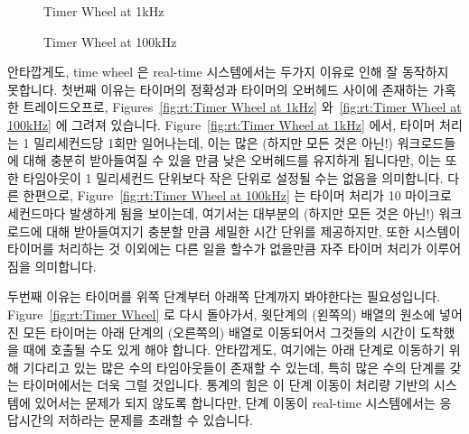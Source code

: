 \begin{figure}[tb]
\centering
{}
\caption{Timer Wheel at 1kHz}
\end{figure}

\begin{figure}[tb]
\centering
{}
\caption{Timer Wheel at 100kHz}
\end{figure}

안타깝게도, time wheel 은 real-time 시스템에서는 두가지 이유로 인해 잘 동작하지
못합니다.
첫번째 이유는 타이머의 정확성과 타이머의 오버헤드 사이에 존재하는 가혹한 트레이드오프로,
Figures~\ref{fig:rt:Timer Wheel at 1kHz}
와~\ref{fig:rt:Timer Wheel at 100kHz}
에 그려져 있습니다.
Figure~\ref{fig:rt:Timer Wheel at 1kHz} 에서, 타이머 처리는 1 밀리세컨드당
1회만 일어나는데, 이는 많은 (하지만 모든 것은 아닌!) 워크로드들에 대해 충분히
받아들여질 수 있을 만큼 낮은 오버헤드를 유지하게 됩니다만, 이는 또한 타임아웃이
1 밀리세컨드 단위보다 작은 단위로 설정될 수는 없음을 의미합니다.
다른 한편으로,
Figure~\ref{fig:rt:Timer Wheel at 100kHz}
는 타이머 처리가 10 마이크로세컨드마다 발생하게 됨을 보이는데, 여기서는
대부분의 (하지만 모든 것은 아닌!) 워크로드에 대해 받아들여지기 충분할 만큼
세밀한 시간 단위를 제공하지만, 또한 시스템이 타이머를 처리하는 것 이외에는 다른
일을 할수가 없을만큼 자주 타이머 처리가 이루어짐을 의미합니다.

두번째 이유는 타이머를 위쪽 단계부터 아래쪽 단계까지 봐야한다는 필요성입니다.
Figure~\ref{fig:rt:Timer Wheel} 로 다시 돌아가서, 윗단계의 (왼쪽의) 배열의
 원소에 넣어진 모든 타이머는 아래 단계의 (오른쪽의) 배열로 이동되어서
그것들의 시간이 도착했을 때에 호출될 수도 있게 해야 합니다.
안타깝게도, 여기에는 아래 단계로 이동하기 위해 기다리고 있는 많은 수의
타임아웃들이 존재할 수 있는데, 특히 많은 수의 단계를 갖는 타이머에서는 더욱
그럴 것입니다.
통계의 힘은 이 단계 이동이 처리량 기반의 시스템에 있어서는 문제가 되지 않도록
합니다만, 단계 이동이 real-time 시스템에서는 응답시간의 저하라는 문제를 초래할
수 있습니다.

